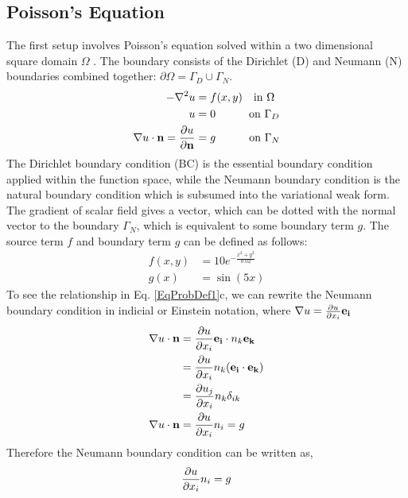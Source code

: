 \documentclass[12pt,3p]{article}
\begin{document}
\subsection{Poisson's Equation}
\vspace{-1ex}
The first setup involves Poisson's equation solved within a two dimensional square domain $\Omega$ . The boundary consists of the Dirichlet (D) and Neumann (N) boundaries combined together: $\partial \Omega = \Gamma_D \cup \Gamma_N$. 
\begin{subequations}\label{EqProbDef1}
\begin{align}
- \nabla^2 u &= f(x,y) \quad \text{in } \Omega \\
		u &= 0 \quad \quad \quad \text{on } \Gamma_D \\
\nabla u \cdot \mathbf{n} = \pdv{u}{\mathbf{n}} &= g \quad \quad \quad \text{on } \Gamma_N
\end{align}
\end{subequations}
The Dirichlet boundary condition (BC) is the essential boundary condition applied within the function space, while the Neumann boundary condition is the natural boundary condition which is subsumed into the variational weak form. The gradient of scalar field gives a vector, which can be dotted with the normal vector to the boundary $\Gamma_N$, which is equivalent to some boundary term $g$. The source term $f$ and boundary term $g$ can be defined as follows:
\begin{subequations}\label{EqSourceBoundTerm}
\begin{align}
f(x,y) &= 10 e^{-\frac{x^2 + y^2}{0.02}} \\
g(x) &= \sin(5x)
\end{align}
\end{subequations} 
To see the relationship in Eq. \ref{EqProbDef1}c, we can rewrite the Neumann boundary condition in indicial or Einstein notation, where $\nabla u = \pdv{u}{x_i} \mathbf{e_i} $
\begin{align*}
\nabla u \cdot \mathbf{n} 
	&= \pdv{u}{x_i} \mathbf{e_i} \cdot n_k \mathbf{e_k} \\
	&= \pdv{u}{x_i} n_k (\mathbf{e_i} \cdot \mathbf{e_k}) \\
	&= \pdv{u_j}{x_i} n_k \delta_{ik} \\
\nabla u \cdot \mathbf{n} &= \pdv{u}{x_i} n_i = g
\end{align*}
Therefore the Neumann boundary condition can be written as,
\begin{equation}\label{EqNBoundInd}
\pdv{u}{x_i} n_i  = g
\end{equation}
\end{document}
